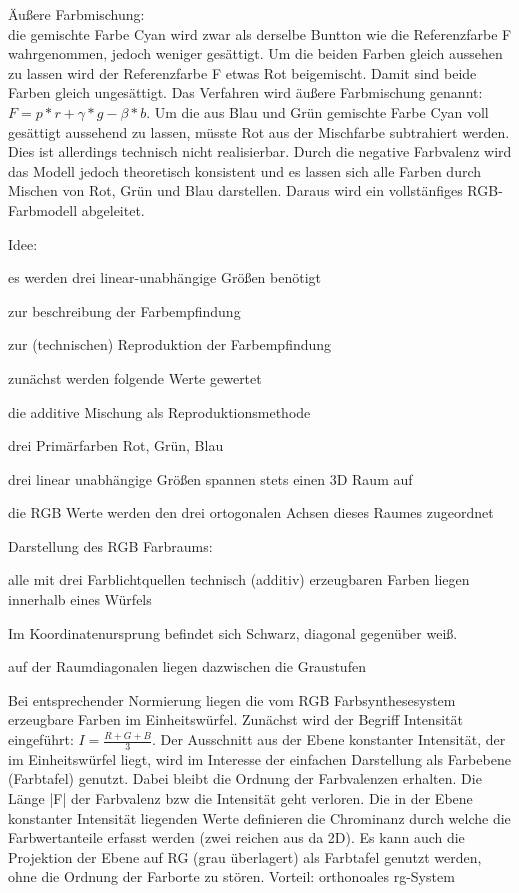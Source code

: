\documentclass[landscape]{article}
\begin{document}
\begin{multicols}{3}
  Äußere Farbmischung:\\
  die gemischte Farbe Cyan wird zwar als derselbe Buntton wie die Referenzfarbe F wahrgenommen, jedoch weniger gesättigt. Um die beiden Farben gleich aussehen zu lassen wird der Referenzfarbe F etwas Rot beigemischt. Damit sind beide Farben gleich ungesättigt. Das Verfahren wird äußere Farbmischung genannt: $F=p*r + \gamma *g - \beta *b$.
  Um die aus Blau und Grün gemischte Farbe Cyan voll gesättigt aussehend zu lassen, müsste Rot aus der Mischfarbe subtrahiert werden. Dies ist allerdings technisch nicht realisierbar. Durch die negative Farbvalenz wird das Modell jedoch theoretisch konsistent und es lassen sich alle Farben durch Mischen von Rot, Grün und Blau darstellen. Daraus wird ein vollstänfiges RGB-Farbmodell abgeleitet.
  
  Idee:
  \begin{itemize*}
    \item es werden drei linear-unabhängige Größen benötigt
    \item zur beschreibung der Farbempfindung
    \item zur (technischen) Reproduktion der Farbempfindung
    \item zunächst werden folgende Werte gewertet
    \item die additive Mischung als Reproduktionsmethode
    \item drei Primärfarben Rot, Grün, Blau
    \item drei linear unabhängige Größen spannen stets einen 3D Raum auf
    \item die RGB Werte werden den drei ortogonalen Achsen dieses Raumes zugeordnet
  \end{itemize*}
  
  Darstellung des RGB Farbraums:
  \begin{itemize*}
    \item alle mit drei Farblichtquellen technisch (additiv) erzeugbaren Farben liegen innerhalb eines Würfels
    \item Im Koordinatenursprung befindet sich Schwarz, diagonal gegenüber weiß.
    \item auf der Raumdiagonalen liegen dazwischen die Graustufen
  \end{itemize*}
  
  Bei entsprechender Normierung liegen die vom RGB Farbsynthesesystem erzeugbare Farben im Einheitswürfel. Zunächst wird der Begriff Intensität eingeführt: $I=\frac{R+G+B}{3}$. Der Ausschnitt aus der Ebene konstanter Intensität, der im Einheitswürfel liegt, wird im Interesse der einfachen Darstellung als Farbebene (Farbtafel) genutzt. Dabei bleibt die Ordnung der Farbvalenzen erhalten. Die Länge |F| der Farbvalenz bzw die Intensität geht verloren.
  Die in der Ebene konstanter Intensität liegenden Werte definieren die Chrominanz durch welche die Farbwertanteile erfasst werden (zwei reichen aus da 2D). Es kann auch die Projektion der Ebene auf RG (grau überlagert) als Farbtafel genutzt werden, ohne die Ordnung der Farborte zu stören. Vorteil: orthonoales rg-System
  

\end{multicols}
\end{document}

